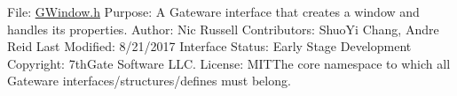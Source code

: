File\+: \mbox{\hyperlink{_g_window_8h_source}{G\+Window.\+h}} Purpose\+: A Gateware interface that creates a window and handles its properties. Author\+: Nic Russell Contributors\+: Shuo\+Yi Chang, Andre Reid Last Modified\+: 8/21/2017 Interface Status\+: Early Stage Development Copyright\+: 7th\+Gate Software L\+LC. License\+: M\+I\+T\+The core namespace to which all Gateware interfaces/structures/defines must belong. 